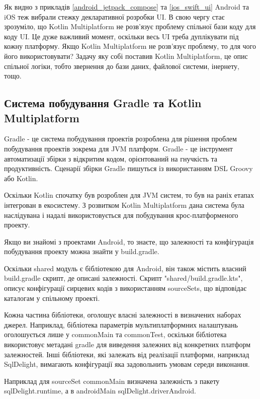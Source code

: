 Як видно з прикладів \ref{android_jetpack_compose} та \ref{ios_swift_ui} Android та iOS теж вибрали стежку декларативної розробки UI.
В свою чергу стає зрозуміло, що Kotlin Multiplatform не розв'язує проблему спільної бази коду для коду UI.
Це дуже важливий момент, оскільки весь UI треба дуплікувати під кожну платформу.
Якщо Kotlin Multiplatform не розв'язує проблему, то для чого його використовувати?
Задачу яку собі поставив Kotlin Multiplatform, це опис спільної логіки, тобто звернення до бази даних, файлової системи, інернету, тощо.

\subsection{Система побудування Gradle та Kotlin Multiplatform}
\label{subsec:kmm_gradle}

Gradle - це система побудування проектів розроблена для рішення проблем побудування проектів зокрема для JVM платформ.
Gradle - це інструмент автоматизації збірки з відкритим кодом, орієнтований на гнучкість та продуктивність. \cite{gradle_user_manual}
Сценарії збірки Gradle пишуться із використанням DSL Groovy або Kotlin. \cite{gradle_user_manual}

Оскільки Kotlin спочатку був розроблен для JVM систем, то був на раніх етапах інтегрован в екосистему.
З розвитком Kotlin Multiplatform дана система була наслідувана і надалі використовується для побудування крос-платформеного проекту.

Якщо ви знайомі з проектами Android, то знаєте, що залежності та конфігурація побудування проекту можна знайти у build.gradle.

Оскільки shared модуль є бібліотекою для Android, він також містить власний build.gradle скрипт, де описані залежності.
Скрипт "shared/build.gradle.kts", описує конфігурації сирцевих кодів з використанням sourceSets, що відповідає каталогам у спільному проекті.

Кожна частина бібліотеки, оголошує власні залежності в визначених наборах джерел.
Наприклад, бібліотека параметрів мультиплатформних налаштувань оголошується лише у commonMain та commonTest,
оскільки бібліотека використовує метадані gradle для виведення залежних від конкретних платформ залежностей.
Інші бібліотеки, які залежать від реалізації платформи, наприклад SqlDelight, вимагають конфігурації яка задовольнить
умовам середи виконання.

Наприклад для sourceSet commonMain визначена залежність з пакету sqlDelight.runtime, а в androidMain sqlDelight.driverAndroid.

